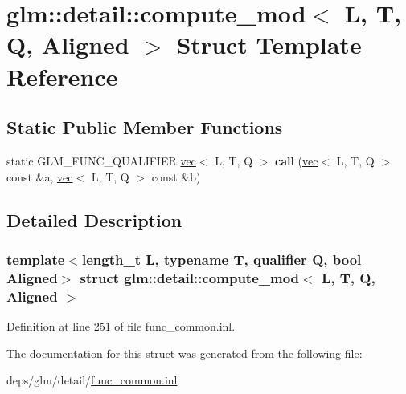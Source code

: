 \hypertarget{structglm_1_1detail_1_1compute__mod}{}\section{glm\+:\+:detail\+:\+:compute\+\_\+mod$<$ L, T, Q, Aligned $>$ Struct Template Reference}
\label{structglm_1_1detail_1_1compute__mod}
\subsection*{Static Public Member Functions}
\begin{DoxyCompactItemize}
\item 
\mbox{\label{structglm_1_1detail_1_1compute__mod_a91bba836ba6e6148d3626aad034a01aa}} 
static G\+L\+M\+\_\+\+F\+U\+N\+C\+\_\+\+Q\+U\+A\+L\+I\+F\+I\+ER \hyperlink{structglm_1_1vec}{vec}$<$ L, T, Q $>$ {\bfseries call} (\hyperlink{structglm_1_1vec}{vec}$<$ L, T, Q $>$ const \&a, \hyperlink{structglm_1_1vec}{vec}$<$ L, T, Q $>$ const \&b)
\end{DoxyCompactItemize}


\subsection{Detailed Description}
\subsubsection*{template$<$length\+\_\+t L, typename T, qualifier Q, bool Aligned$>$\newline
struct glm\+::detail\+::compute\+\_\+mod$<$ L, T, Q, Aligned $>$}



Definition at line 251 of file func\+\_\+common.\+inl.



The documentation for this struct was generated from the following file\+:\begin{DoxyCompactItemize}
\item 
deps/glm/detail/\hyperlink{func__common_8inl}{func\+\_\+common.\+inl}\end{DoxyCompactItemize}
